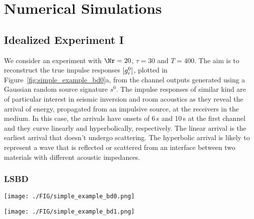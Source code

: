 

\section{Numerical Simulations}
\label{sec:ex}

\subsection{Idealized Experiment I}
We consider an
experiment with $\Nr=20$, $\tau=30$ and $T=400$.
%
The aim is to
reconstruct the true impulse responses $\vecc{g^{0}_{i}}$,
plotted in Figure~\ref{fig:simple_example_bd0}a, 
from the channel outputs generated using a 
Gaussian random source signature $s^{0}$.
%
The impulse responses of 
similar kind  
are of 
particular interest in seismic inversion and room acoustics 
as they reveal the arrival
of 
energy,
propagated from an impulsive source,
at the receivers in the medium.
%
In this case, the arrivals have onsets of 6$\,$s and 10$\,$s at the first channel and they 
curve 
linearly and hyperbolically, respectively.
%
The linear arrival is 
the earliest arrival that doesn't undergo scattering.
%
The hyperbolic arrival is likely to represent a wave that is 
reflected or scattered from an interface between two materials with different acoustic impedances.
%
\subsubsection*{LSBD}

\begin{figure*}
	\begin{center}
		{
		\texttt{[image: ./FIG/simple\_example\_bd0.png]}
			}
		{
	\begin{tikzpicture}
		
	\end{tikzpicture}
		}
	\end{center}
	\caption{
		Idealized Experiment I.
	 The results are displayed as images that use 
	 the full range of colors in a colormap. 
	 Each pixel of these images corresponds to a time $t$ and a channel index $i$.
	 Impulse responses: a) true; b)---d) undesired.
	 }
	\label{fig:simple_example_bd0}
\end{figure*}


\begin{figure*}
	\begin{center}
		{
		\texttt{[image: ./FIG/simple\_example\_bd1.png]}
			}
		{
	\begin{tikzpicture}
		
	\end{tikzpicture}
		}
	\end{center}
	\caption{
		Idealized Experiment I.
		Cross-correlations of impulse responses corresponding to the Figure~\ref{fig:simple_example_bd0}:
	 a) true; b)---d) undesired.
	 }
	\label{fig:simple_example_bd1}
\end{figure*}


